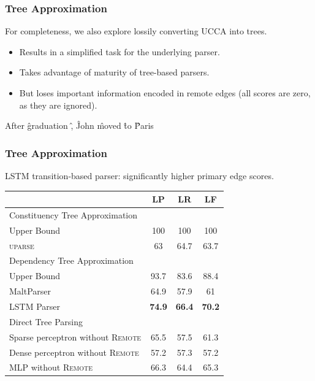 \documentclass[t]{beamer}
\begin{document}
\begin{frame}
\frametitle{Tree Approximation}
For completeness, we also explore lossily converting UCCA into trees.
\begin{itemize}
 \item Results in a simplified task for the underlying parser.
 \item Takes advantage of maturity of tree-based parsers.
 \item But loses important information encoded in remote edges
   (all scores are zero, as they are ignored).
\end{itemize}

\vfill
\begin{center}
	\begin{dependency}[theme = simple]
	\begin{deptext}[column sep=.7em,ampersand replacement=\^]
	After \^ graduation \^ , \^ John \^ moved \^ to \^ Paris \\
	\end{deptext}
	\end{dependency}
\end{center}
\end{frame}


\begin{frame}
\frametitle{Tree Approximation}
LSTM transition-based parser: significantly higher primary edge scores.
\begin{center}
	\begin{tabular}{l|ccc}
	& \textbf{LP} & \textbf{LR} & \textbf{LF} \\
	\hline
	\multicolumn{4}{l}{\rule{0pt}{2ex} \footnotesize Constituency Tree Approximation} \\
	Upper Bound & 100 & 100 & 100 \vspace{.1cm} \\
	\textsc{uparse} \cite{maier-lichte:2016:DiscoNLP} & 63 & 64.7 & 63.7 \\
	\hline
	\multicolumn{4}{l}{\rule{0pt}{2ex} \footnotesize Dependency Tree Approximation} \\
	Upper Bound & 93.7 & 83.6 & 88.4 \vspace{.1cm} \\
	MaltParser \cite{nivre2007maltparser} & 64.9 & 57.9 & 61 \\
	LSTM Parser \cite{dyer2015transition} & \bf 74.9 & \bf 66.4 & \bf 70.2 \\
	\hline
	\multicolumn{4}{l}{\rule{0pt}{2ex} \footnotesize Direct Tree Parsing} \\
	Sparse perceptron without \textsc{Remote} & 65.5 & 57.5 & 61.3 \\
	Dense perceptron without \textsc{Remote} & 57.2 & 57.3 & 57.2 \\
	MLP without \textsc{Remote} & 66.3 & 64.4 & 65.3 \\
	\end{tabular}
\end{center}
\end{frame}
\end{document}
